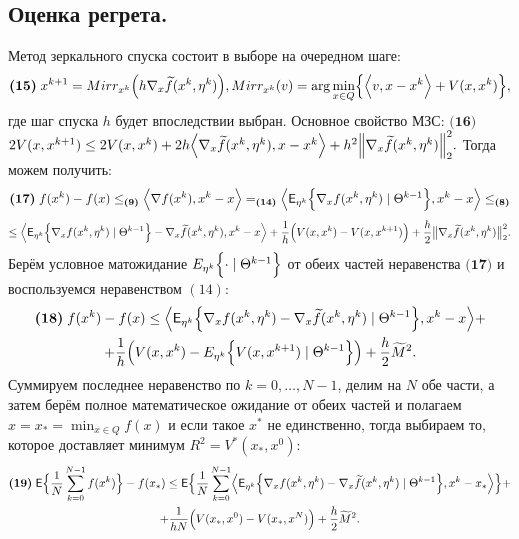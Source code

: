 \documentclass[12pt]{article}
\begin{document}
\subsection{Оценка регрета.}
 Метод зеркального спуска состоит в выборе на очередном шаге: 
 $$
 \textbf{(15)}\; x^{k + 1} = Mirr_{x^k} \Bigl(h \nabla_x \widetilde f(x^k, \eta^k) \Bigr), Mirr_{x^k} (v) = \arg \min_{x \in Q} \Bigl\{ \Bigl \langle v, x - x^k \Bigr \rangle + V(x, x^k) \Bigr\},
 $$
 где шаг спуска $h$ будет впоследствии выбран.
 \newline
 \newline
 Основное свойство МЗС:
 \newline
 \newline
 $\textbf{(16)}$ $2V(x, x^{k + 1}) \leq 2V(x, x^k) + 2h \Bigl \langle \nabla_x \widetilde f(x^k, \eta^k), x - x^k \Bigr \rangle + h^2 \Bigl\| \nabla_x \widetilde f(x^k, \eta^k)\Bigr\|_2^2.
 $
 Тогда можем получить: 
$$
 \textbf{(17)} \; f(x^k) - f(x) \leq_{\textbf{(9)}} \Bigl \langle \nabla f(x^k), x^k - x \Bigr \rangle =_{\textbf{(14)}} \Bigl \langle \mathsf E_{\eta^k} \Bigl\{\nabla_x f(x^k, \eta^k)\; |\; \Theta^{k - 1} \Bigr\}, x^k - x \Bigr \rangle \leq_{\textbf{(8)}}
 $$ 
 \begin{multline*}
 \leq \Bigl \langle \mathsf E_{\eta^k} \Bigl\{\nabla_x f(x^k, \eta^k)\; |\; \Theta^{k - 1}\Bigr\} - \nabla_x \widetilde f(x^k, \eta^k) , x^k - x \Bigr \rangle + \frac{1}{h}\Bigl(V(x, x^k) - V(x, x^{k + 1})\Bigr) + \frac{h}{2}\bigl\| \nabla_x \widetilde f(x^k, \eta^k)\bigr\|_2^2. 
 \end{multline*}
 Берём условное матожидание $E_{\eta^k} \Bigl\{\cdot \; |\; \Theta^{k - 1} \Bigr\}$ от обеих частей неравенства $ \textbf{(17)}$ и воспользуемся неравенством $(14)$:
  \begin{multline*}
 \textbf{(18)} \; f(x^k) - f(x) \leq \Bigl \langle \mathsf E_{\eta^k} \Bigl\{\nabla_x f(x^k, \eta^k) - \nabla_x \widetilde f(x^k, \eta^k) \; |\; \Theta^{k - 1} \Bigr\} , x^k - x \Bigr \rangle + \\ + \frac{1}{h}\Bigl(V(x, x^k) - E_{\eta^k} \Bigl\{V(x, x^{k + 1}) \; |\; \Theta^{k - 1} \Bigr\}\Bigr) + \frac{h}{2}{\widetilde M}^2.
 \end{multline*}
 Суммируем последнее неравенство по $k = 0, \dots, N - 1$, делим на $N$ обе части, а затем берём полное математическое ожидание от обеих частей и полагаем $x = x_* = \min_{x \in Q} f(x)$ и если такое $x^*$ не единственно, тогда выбираем то, которое доставляет минимум $R^2 = V^*(x_*, x^0)$:
\begin{multline*}
 \textbf{(19)} \; \mathsf E \Bigl\{\frac{1}{N}\sum \limits_{k = 0}^{N - 1}f(x^k) \Bigr\} - f(x_*)  \leq  \mathsf E \Bigl\{\frac{1}{N} \sum \limits_{k = 0}^{N - 1} \Bigl \langle \mathsf E_{\eta^k} \Bigl \{\nabla_x f(x^k, \eta^k) - \nabla_x \widetilde f(x^k, \eta^k)\;|\; \Theta^{k - 1}\Bigr \}, x^k - x_* \Bigr \rangle \Bigr\} + \\ + \frac{1}{hN}\Bigl(V(x_*, x^0) - V(x_*, x^{N})\Bigr) +  \frac{h}{2}{\widetilde M}^2.
\end{multline*}
\end{document}
